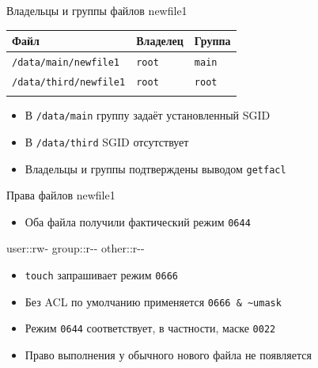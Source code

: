 \documentclass[
  ignorenonframetext,
  aspectratio=169,
  russian,
]{beamer}
\newenvironment{Shaded}{\begin{snugshade}}{\end{snugshade}}
\newcommand{\NormalTok}[1]{\textcolor[rgb]{0.00,0.23,0.31}{#1}}
\newcounter{none} %
\providecommand{\tightlist}{%
  \setlength{\itemsep}{0pt}\setlength{\parskip}{0pt}}
\begin{document}
\begin{frame}[fragile]{Владельцы и группы файлов newfile1}
\protect{}\label{ux432ux43bux430ux434ux435ux43bux44cux446ux44b-ux438-ux433ux440ux443ux43fux43fux44b-ux444ux430ux439ux43bux43eux432-newfile1}
{\def\LTcaptype{none} %
\begin{longtable}[]{@{}lll@{}}
\toprule\noalign{}
Файл & Владелец & Группа \\
\midrule\noalign{}
\endhead
\texttt{/data/main/newfile1} & \texttt{root} & \texttt{main} \\
\texttt{/data/third/newfile1} & \texttt{root} & \texttt{root} \\
\bottomrule\noalign{}
\end{longtable}
}

\begin{itemize}
\tightlist
\item
  В \texttt{/data/main} группу задаёт установленный SGID
\item
  В \texttt{/data/third} SGID отсутствует
\item
  Владельцы и группы подтверждены выводом \texttt{getfacl}
\end{itemize}
\end{frame}

\begin{frame}[fragile]{Права файлов newfile1}
\protect{}\label{ux43fux440ux430ux432ux430-ux444ux430ux439ux43bux43eux432-newfile1}
\begin{itemize}
\tightlist
\item
  Оба файла получили фактический режим \texttt{0644}
\end{itemize}

\begin{Shaded}
\begin{Highlighting}[]
\NormalTok{user::rw{-}}
\NormalTok{group::r{-}{-}}
\NormalTok{other::r{-}{-}}
\end{Highlighting}
\end{Shaded}

\begin{itemize}
\tightlist
\item
  \texttt{touch} запрашивает режим \texttt{0666}
\item
  Без ACL по умолчанию применяется
  \texttt{0666\ \&\ \textasciitilde{}umask}
\item
  Режим \texttt{0644} соответствует, в частности, маске \texttt{0022}
\item
  Право выполнения у обычного нового файла не появляется
\end{itemize}
\end{frame}
\end{document}
